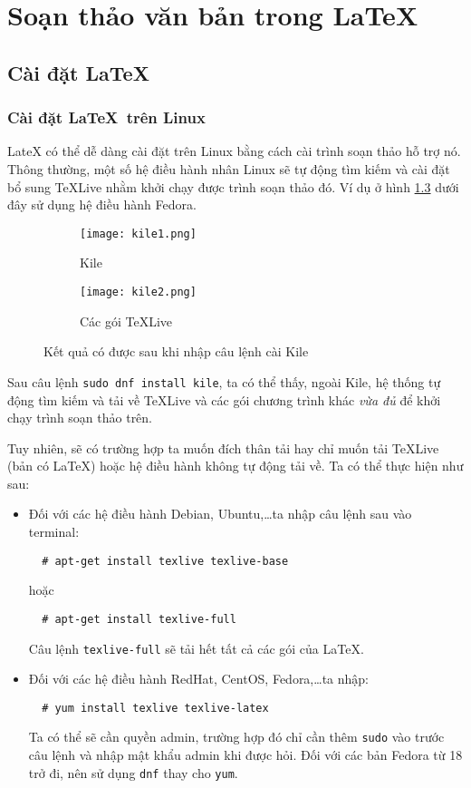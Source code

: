 \chapter{Soạn thảo văn bản trong \LaTeX}\label{ch:2}
\section{Cài đặt \LaTeX}\label{sec:2.1}
\subsection{Cài đặt \LaTeX\ trên Linux}\label{subsec:2.1.1}   
\renewcommand{\labelitemi}{\textbullet}
LateX có thể dễ dàng cài đặt trên Linux bằng cách cài trình soạn thảo hỗ trợ nó. Thông thường,
một số hệ điều hành nhân Linux sẽ tự động tìm kiếm và cài đặt bổ sung TeXLive nhằm khởi chạy
được trình soạn thảo đó. Ví dụ ở hình \ref{fig:kile} dưới đây sử dụng hệ điều hành Fedora.\par
\begin{figure}[H] 
 \begin{subfigure}{0.5\textwidth}
  \texttt{[image: kile1.png]}
  \caption{Kile}
  \label{fig:kile1}
 \end{subfigure}
 \begin{subfigure}{0.5\textwidth}
  \texttt{[image: kile2.png]}
  \caption{Các gói TeXLive}
  \label{fig:kile2}
 \end{subfigure}

 \caption{Kết quả có được sau khi nhập câu lệnh cài Kile}
 \label{fig:kile}
\end{figure}


Sau câu lệnh \verb|sudo dnf install kile|, ta có thể thấy, ngoài Kile, hệ thống tự động tìm kiếm
và tải về TeXLive và các gói chương trình khác \emph{vừa đủ} để khởi chạy trình soạn thảo trên.\par
\clearpage 
Tuy nhiên, sẽ có trường hợp ta muốn đích thân tải hay chỉ muốn tải TeXLive (bản có LaTeX) hoặc
hệ điều hành không tự động tải về. Ta có thể thực hiện như sau:\par

\begin{itemize}
 \item Đối với các hệ điều hành Debian, Ubuntu,\dots ta nhập câu lệnh sau vào terminal:
 
 \begin{verbatim}
  # apt-get install texlive texlive-base 
 \end{verbatim}
 hoặc
 \begin{verbatim}
  # apt-get install texlive-full 
 \end{verbatim}
 Câu lệnh \verb|texlive-full| sẽ tải hết tất cả các gói của LaTeX.
 \item Đối với các hệ điều hành RedHat, CentOS, Fedora,\dots ta nhập:
 \begin{verbatim}
  # yum install texlive texlive-latex 
 \end{verbatim}
 Ta có thể sẽ cần quyền admin, trường hợp đó chỉ cần thêm \verb|sudo| vào trước câu lệnh và nhập mật
 khẩu admin khi được hỏi. Đối với các bản Fedora từ 18 trở đi, nên sử dụng \verb|dnf| thay cho
 \verb|yum|.
\end{itemize}

